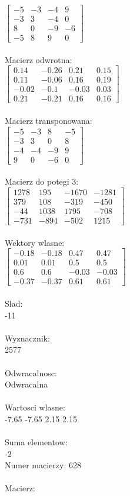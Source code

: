 \documentclass[a4paper,12pt]{article}
\begin{document}
$\begin{bmatrix} -5&-3&-4&9\\-3&3&-4&0\\8&0&-9&-6\\-5&8&9&0 \end{bmatrix}$
\\
\\
Macierz odwrotna:\\

$\begin{bmatrix} 0.14&-0.26&0.21&0.15\\0.11&-0.06&0.16&0.19\\-0.02&-0.1&-0.03&0.03\\0.21&-0.21&0.16&0.16 \end{bmatrix}$
\\
\\
Macierz transponowana:\\

$\begin{bmatrix} -5&-3&8&-5\\-3&3&0&8\\-4&-4&-9&9\\9&0&-6&0 \end{bmatrix}$
\\
\\
Macierz do potegi 3:\\

$\begin{bmatrix} 1278&195&-1670&-1281\\379&108&-319&-450\\-44&1038&1795&-708\\-731&-894&-502&1215 \end{bmatrix}$
\\
\\
Wektory wlasne:\\

$\begin{bmatrix} -0.18&-0.18&0.47&0.47\\0.01&0.01&0.5&0.5\\0.6&0.6&-0.03&-0.03\\-0.37&-0.37&0.61&0.61 \end{bmatrix}$
\\
\\
Slad:\\
-11
\\
\\
Wyznacznik:\\
2577
\\
\\
Odwracalnosc:\\
Odwracalna
\\
\\
Wartosci wlasne:\\
-7.65 -7.65 2.15 2.15
\\
\\
Suma elementow:\\
-2
\\
\newpage
Numer macierzy:
628
\\
\\
Macierz:\\
\end{document}
